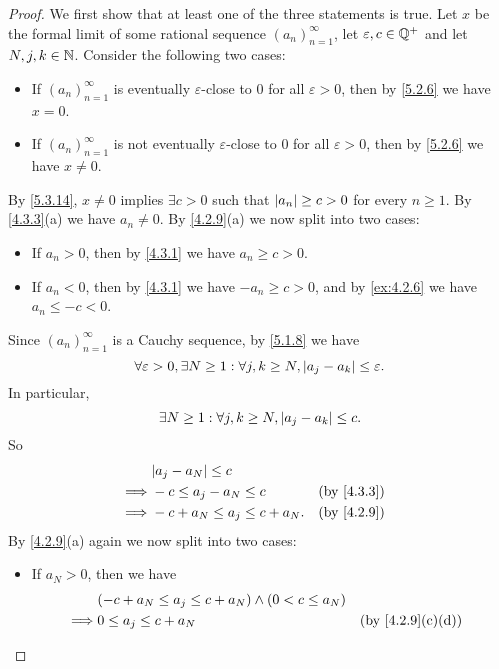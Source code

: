 \begin{proof}
  We first show that at least one of the three statements is true.
  Let \(x\) be the formal limit of some rational sequence \((a_n)_{n = 1}^{\infty}\), let \(\varepsilon, c \in \mathbb{Q}^+\) and let \(N, j, k \in \mathbb{N}\).
  Consider the following two cases:
  \begin{itemize}
    \item If \((a_n)_{n = 1}^{\infty}\) is eventually \(\varepsilon\)-close to \(0\) for all \(\varepsilon > 0\), then by \cref{5.2.6} we have \(x = 0\).
    \item If \((a_n)_{n = 1}^{\infty}\) is not eventually \(\varepsilon\)-close to \(0\) for all \(\varepsilon > 0\), then by \cref{5.2.6} we have \(x \neq 0\).
  \end{itemize}
  By \cref{5.3.14}, \(x \neq 0\) implies \(\exists c > 0\) such that \(\left\lvert a_n\right\rvert \geq c > 0\) for every \(n \geq 1\).
  By \cref{4.3.3}(a) we have \(a_n \neq 0\).
  By \cref{4.2.9}(a) we now split into two cases:
  \begin{itemize}
    \item If \(a_n > 0\), then by \cref{4.3.1} we have \(a_n \geq c > 0\).
    \item If \(a_n < 0\), then by \cref{4.3.1} we have \(-a_n \geq c > 0\), and by \cref{ex:4.2.6} we have \(a_n \leq -c < 0\).
  \end{itemize}
  Since \((a_n)_{n = 1}^{\infty}\) is a Cauchy sequence, by \cref{5.1.8} we have
  \[
    \forall \varepsilon > 0, \exists N \geq 1 : \forall j, k \geq N, \left\lvert a_j - a_k\right\rvert \leq \varepsilon.
  \]
  In particular,
  \[
    \exists N \geq 1 : \forall j, k \geq N, \left\lvert a_j - a_k\right\rvert \leq c.
  \]
  So
  \begin{align*}
             & \abs{a_j - a_N} \leq c                          \\
    \implies & -c \leq a_j - a_N \leq c        &  & \by{4.3.3} \\
    \implies & -c + a_N \leq a_j \leq c + a_N. &  & \by{4.2.9} \\
  \end{align*}
  By \cref{4.2.9}(a) again we now split into two cases:
  \begin{itemize}
    \item If \(a_N > 0\), then we have
          \begin{align*}
                     & (-c + a_N \leq a_j \leq c + a_N) \land (0 < c \leq a_N)                                               \\
            \implies & 0 \leq a_j \leq c + a_N                                 &            & \text{(by \cref{4.2.9}(c)(d))} \\

\end{align*}
\end{itemize}
\end{proof}
